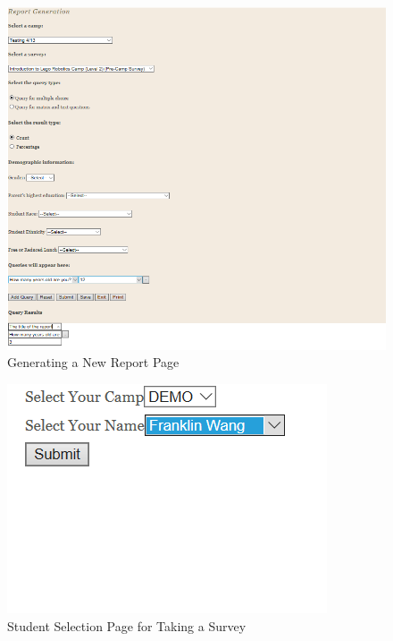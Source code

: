 \documentclass[letterpaper,10pt,serif,draftclsnofoot,onecolumn,compsoc,titlepage]{IEEEtran}
\begin{document}
\begin{figure}[!htbp]
\centering
\includegraphics[scale=.9]{ProjectImages/ReportGeneration.png}
\caption{Generating a New Report Page}
\label{fig:code2}
\end{figure}  

\begin{figure}[!htbp]
\centering
\includegraphics[scale=.9]{ProjectImages/StudentLogin.png}
\caption{Student Selection Page for Taking a Survey}
\label{fig:code2}
\end{figure}  
\end{document}
